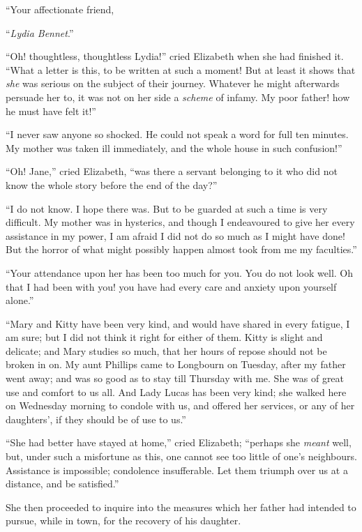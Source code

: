 ``Your affectionate friend,

\medskip
``\emph{Lydia Bennet}.''
\bigskip

``Oh! thoughtless, thoughtless Lydia!'' cried Elizabeth when she
had finished it.  ``What a letter is this, to be written at such
a moment!  But at least it shows that \emph{she} was serious on the
subject of their journey.  Whatever he might afterwards
persuade her to, it was not on her side a \emph{scheme} of infamy.
My poor father! how he must have felt it!''

``I never saw anyone so shocked.  He could not speak a word
for full ten minutes.  My mother was taken ill immediately,
and the whole house in such confusion!''

``Oh! Jane,'' cried Elizabeth, ``was there a servant belonging to it
who did not know the whole story before the end of the day?''

``I do not know.  I hope there was.  But to be guarded at such a
time is very difficult.  My mother was in hysterics, and though
I endeavoured to give her every assistance in my power, I am
afraid I did not do so much as I might have done!  But the
horror of what might possibly happen almost took from me
my faculties.''

``Your attendance upon her has been too much for you.  You do
not look well.  Oh that I had been with you!  you have had
every care and anxiety upon yourself alone.''

``Mary and Kitty have been very kind, and would have shared in
every fatigue, I am sure; but I did not think it right for either
of them.  Kitty is slight and delicate; and Mary studies so much,
that her hours of repose should not be broken in on.  My aunt
Phillips came to Longbourn on Tuesday, after my father went
away; and was so good as to stay till Thursday with me.  She
was of great use and comfort to us all.  And Lady Lucas has
been very kind; she walked here on Wednesday morning to
condole with us, and offered her services, or any of her
daughters', if they should be of use to us.''

``She had better have stayed at home,'' cried Elizabeth; ``perhaps
she \emph{meant} well, but, under such a misfortune as this, one
cannot see too little of one's neighbours.  Assistance is
impossible; condolence insufferable.  Let them triumph over us
at a distance, and be satisfied.''

She then proceeded to inquire into the measures which her
father had intended to pursue, while in town, for the recovery
of his daughter.

